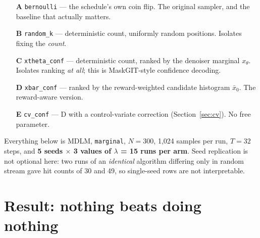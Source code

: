 \documentclass[11pt]{article}
\begin{document}
\begin{itemize}
  \item[\textbf{A}] \texttt{bernoulli} --- the schedule's own coin flip. The
        original sampler, and the baseline that actually matters.
  \item[\textbf{B}] \texttt{random\_k} --- deterministic count, uniformly random
        positions. Isolates fixing the \emph{count}.
  \item[\textbf{C}] \texttt{xtheta\_conf} --- deterministic count, ranked by the
        denoiser marginal $x_\theta$. Isolates ranking \emph{at all}; this is
        MaskGIT-style confidence decoding.
  \item[\textbf{D}] \texttt{xbar\_conf} --- ranked by the reward-weighted
        candidate histogram $\bar{x}_0$. The reward-aware version.
  \item[\textbf{E}] \texttt{cv\_conf} --- D with a control-variate correction
        (Section~\ref{sec:cv}). No free parameter.
\end{itemize}

Everything below is MDLM, \texttt{marginal}, $N=300$, 1{,}024 samples per run,
$T=32$ steps, and \textbf{5 seeds $\times$ 3 values of $\lambda$ = 15 runs per
arm}. Seed replication is not optional here: two runs of an \emph{identical}
algorithm differing only in random stream gave hit counts of 30 and 49, so
single-seed rows are not interpretable.

\section{Result: nothing beats doing nothing}
\begin{table}[htbp]
\centering
\small
{}
\caption{QED: the five arms, mean $\pm$ standard error over 15 runs.}
\label{tab:conf-abs-qed}
\end{table}
\end{document}

